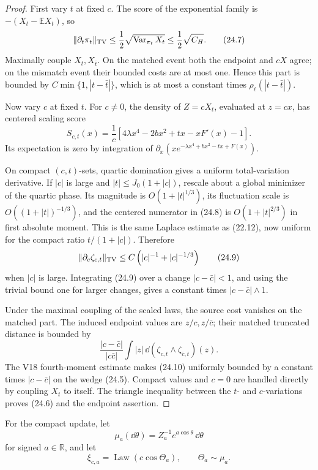 \documentclass[11pt]{article}
\theoremstyle{remark}
\begin{document}
\begin{proof}
First vary \(t\) at fixed \(c\).  The score of the exponential
family is \(-(X_t-\mathbb EX_t)\), so
\[
 \|\partial_t\pi_t\|_{\rm TV}
 \le\frac12\sqrt{\operatorname{Var}_{\pi_t}X_t}
 \le\frac12\sqrt{C_H}.                                      \tag{24.7}
\]
Maximally couple \(X_t,X_{\bar t}\).  On the matched event both the
endpoint and \(cX\) agree; on the mismatch event their bounded
costs are at most one.  Hence this part is bounded by
\(C\min\{1,|t-\bar t|\}\), which is at most a constant times
\(\rho_\ell(|t-\bar t|)\).

Now vary \(c\) at fixed \(t\).  For \(c\ne0\), the density of
\(Z=cX_t\), evaluated at \(z=cx\), has centered scaling score
\[
 S_{c,t}(x)
 =
 \frac1c\left[
 4\lambda x^4-2bx^2+tx-xF'(x)-1
 \right].                                                   \tag{24.8}
\]
Its expectation is zero by integration of
\(\partial_x(xe^{-\lambda x^4+bx^2-tx+F(x)})\).

On compact \((c,t)\)-sets, quartic domination gives a uniform
total-variation derivative.  If \(|c|\) is large and
\(|t|\le J_0(1+|c|)\), rescale about a global minimizer of the
quartic phase.  Its magnitude is \(O(1+|t|^{1/3})\), its
fluctuation scale is \(O((1+|t|)^{-1/3})\), and the centered
numerator in (24.8) is \(O(1+|t|^{2/3})\) in first absolute
moment.  This is the same Laplace estimate as (22.12), now uniform
for the compact ratio \(t/(1+|c|)\).  Therefore
\[
 \|\partial_c\zeta_{c,t}\|_{\rm TV}
 \le C\left(
 |c|^{-1}+|c|^{-1/3}
 \right)                                                    \tag{24.9}
\]
when \(|c|\) is large.  Integrating (24.9) over a change
\(|c-\bar c|<1\), and using the trivial bound one for larger
changes, gives a constant times \(|c-\bar c|\wedge1\).

Under the maximal coupling of the scaled laws, the source cost
vanishes on the matched part.  The induced endpoint values are
\(z/c,z/\bar c\); their matched truncated distance is bounded by
\[
 \frac{|c-\bar c|}{|c\bar c|}
 \int|z|\,\dd(\zeta_{c,t}\wedge\zeta_{\bar c,t})(z).         \tag{24.10}
\]
The V18 fourth-moment estimate makes (24.10) uniformly bounded by
a constant times \(|c-\bar c|\) on the wedge (24.5).  Compact
values and \(c=0\) are handled directly by coupling \(X_t\) to
itself.  The triangle inequality between the \(t\)- and
\(c\)-variations proves (24.6) and the endpoint assertion.
\end{proof}

For the compact update, let
\[
 \mu_a(\dd\theta)
 =
 Z_a^{-1}e^{a\cos\theta}\,\dd\theta                         \tag{24.11}
\]
for signed \(a\in\mathbb R\), and let
\[
 \xi_{c,a}=\operatorname{Law}(c\cos\Theta_a),
 \qquad\Theta_a\sim\mu_a.                                  \tag{24.12}
\]
\end{document}

